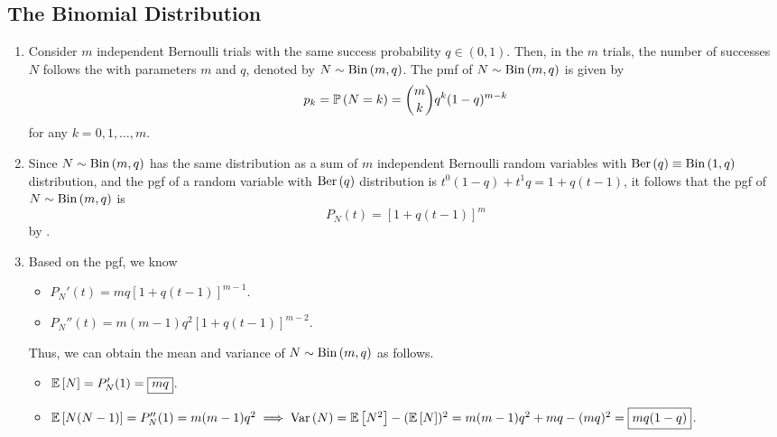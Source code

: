 \subsection{The Binomial Distribution}
\begin{enumerate}
\item Consider \(m\) independent Bernoulli trials with the same success
probability \(q\in(0,1)\). Then, in the \(m\) trials, the number of successes \(N\)
follows the  with parameters \(m\) and \(q\),
denoted by \(N\sim\operatorname{Bin}\left(m,q\right)\). The pmf of \(N\sim\operatorname{Bin}\left(m,q\right)\) is given by
\[
p_k=\mathbb{P}\left(N=k\right)=\binom{m}{k}q^k(1-q)^{m-k}
\]
for any \(k=0,1,\dotsc,m\).

\item \label{it:bin-pgf}
Since \(N\sim\operatorname{Bin}\left(m,q\right)\) has the same distribution as a sum of \(m\)
independent Bernoulli random variables with \(\operatorname{Ber}\left(q\right)\equiv\operatorname{Bin}\left(1,q\right)\) distribution, and the
pgf of a random variable with \(\operatorname{Ber}\left(q\right)\) distribution is
\(t^0(1-q)+t^1q=1+q(t-1)\), it follows that the pgf of \(N\sim\operatorname{Bin}\left(m,q\right)\) is
\[
P_N(t)=\boxed{[1+q(t-1)]^m}
\]
by .

\item \label{it:bin-mean-var}
Based on the pgf, we know
\begin{itemize}
\item \(P_N'(t)=mq[1+q(t-1)]^{m-1}\).
\item \(P_N''(t)=m(m-1)q^2[1+q(t-1)]^{m-2}\).
\end{itemize}

Thus, we can obtain the mean and variance of \(N\sim\operatorname{Bin}\left(m,q\right)\) as follows.
\begin{itemize}
\item \(\mathbb{E}\left[N\right]=P_N'(1)=\boxed{mq}\).
\item \(\mathbb{E}\left[N(N-1)\right]=P_N''(1)=m(m-1)q^2\implies
\operatorname{Var}\left(N\right)=\mathbb{E}\left[N^2\right]-(\mathbb{E}\left[N\right])^2
=m(m-1)q^2+mq-(mq)^2
=\boxed{mq(1-q)}\).
\end{itemize}
\end{enumerate}
